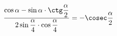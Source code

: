 \begin{ex}[type=prove_identity]
	\begin{condition}
		\( \dfrac{\cos\alpha-\sin\alpha\cdot\ctg\dfrac{\alpha}{2}}{2\sin\dfrac{\alpha}{4}\cdot\cos\dfrac{\alpha}{4}}=-\cosec\dfrac{\alpha}{2} \)
	\end{condition}
\end{ex}